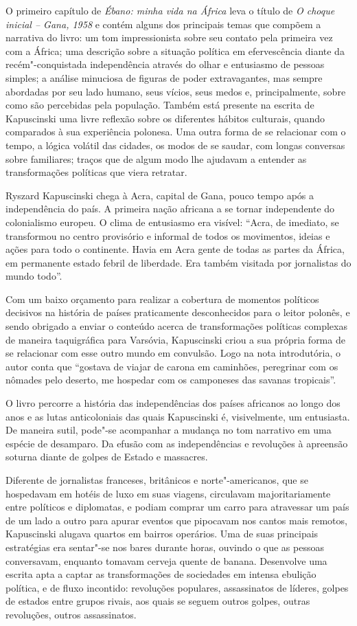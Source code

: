O primeiro capítulo de \emph{Ébano: minha vida na África} leva o título
de \emph{O choque inicial -- Gana, 1958} e contém alguns dos principais
temas que compõem a narrativa do livro: um tom impressionista sobre seu
contato pela primeira vez com a África; uma descrição sobre a situação
política em efervescência diante da recém"-conquistada independência
através do olhar e entusiasmo de pessoas simples; a análise minuciosa de
figuras de poder extravagantes, mas sempre abordadas por seu lado
humano, seus vícios, seus medos e, principalmente, sobre como são
percebidas pela população. Também está presente na escrita de
Kapuscinski uma livre reflexão sobre os diferentes hábitos culturais,
quando comparados à sua experiência polonesa. Uma outra forma de se
relacionar com o tempo, a lógica volátil das cidades, os modos de se
saudar, com longas conversas sobre familiares; traços que
de algum modo lhe ajudavam a entender as transformações políticas que
viera retratar.

Ryszard Kapuscinski chega à Acra, capital de Gana, pouco tempo após a
independência do país. A primeira nação africana a se tornar
independente do colonialismo europeu. O clima de entusiasmo era visível:
``Acra, de imediato, se transformou no centro provisório e informal de
todos os movimentos, ideias e ações para todo o continente. Havia em
Acra gente de todas as partes da África, em permanente estado febril de
liberdade. Era também visitada por jornalistas do mundo todo''.

Com um baixo orçamento para realizar a cobertura de momentos políticos
decisivos na história de países praticamente desconhecidos para o leitor
polonês, e sendo obrigado a enviar o conteúdo acerca de transformações
políticas complexas de maneira taquigráfica para Varsóvia, Kapuscinski
criou a sua própria forma de se relacionar com esse outro mundo em
convulsão. Logo na nota introdutória, o autor conta que ``gostava de
viajar de carona em caminhões, peregrinar com os nômades pelo deserto,
me hospedar com os camponeses das savanas tropicais''.

O livro percorre a história das independências dos países africanos ao
longo dos anos e as lutas anticoloniais das quais Kapuscinski é,
visivelmente, um entusiasta. De maneira sutil, pode"-se acompanhar a
mudança no tom narrativo em uma espécie de desamparo. Da efusão com as
independências e revoluções à apreensão soturna diante de golpes de
Estado e massacres.

Diferente de jornalistas franceses, britânicos e norte"-americanos, que
se hospedavam em hotéis de luxo em suas viagens, circulavam
majoritariamente entre políticos e diplomatas, e podiam comprar um carro
para atravessar um país de um lado a outro para apurar eventos que
pipocavam nos cantos mais remotos, Kapuscinski alugava quartos em
bairros operários. Uma de suas principais estratégias era
sentar"-se nos bares durante horas, ouvindo o que as pessoas conversavam,
enquanto tomavam cerveja quente de banana. Desenvolve uma escrita apta a
captar as transformações de sociedades em intensa ebulição política, e
de fluxo incontido: revoluções populares, assassinatos de líderes,
golpes de estados entre grupos rivais, aos quais se seguem outros
golpes, outras revoluções, outros assassinatos.

